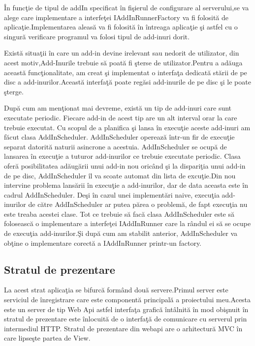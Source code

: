 \documentclass[a4paper,12pt]{report}
\begin{document}
\^In func\c tie de tipul de addIn specificat \^in fi\c sierul de configurare al serverului,se va alege care implementare a 
interfe\c tei IAddInRunnerFactory va fi folosit\u a de aplica\c tie.Implementarea aleas\u a va fi folosit\u a \^in \^intreaga
aplica\c tie  \c si astfel cu o singur\u a verificare programul va folosi tipul de add-inuri dorit.

Exist\u a situa\c tii \^in care un add-in devine irelevant sau nedorit de utilizator, din acest motiv,Add-Inurile trebuie 
s\u a poat\u a fi \c sterse de utilizator.Pentru a ad\u auga aceast\u a func\c tionalitate, am creat \c si implementat o
 interfa\c ta dedicat\u a st\u arii de pe disc a add-inurilor.Aceast\u a interfa\c t\u a poate reg\u asi add-inurile de pe disc
 \c si le poate \c sterge.

 Dup\u a cum am men\c tionat mai devreme, exist\u a un tip de add-inuri care sunt executate periodic. Fiecare add-in de acest tip 
 are un alt interval orar la care trebuie executat. Cu scopul de a planifica \c si lansa \^in execu\c tie aceste add-inuri am f\u acut
 clasa AddInScheduler. AddInScheduler opereaz\u a \^intr-un fir de execu\c tie separat datorit\u a naturii asincrone a acestuia.
  AddInScheduler se ocup\u a de lansarea \^in execu\c tie a tuturor add-inurilor ce trebuie executate periodic.
 Clasa ofer\u a posibilitatea ad\u aug\u arii unui add-in nou oric\^and \c si la dispari\c tia unui add-in de pe disc, AddInScheduler
 \^il va scoate automat din lista de excu\c tie.Din nou intervine problema lans\u arii \^in execu\c tie a add-inurilor,
 dar de data aceasta este \^in cadrul AddInScheduler. De\c si \^in cazul unei implement\u ari naive, execu\c tia add-inurilor
 de c\u atre AddInScheduler ar putea p\u area o problem\u a, de fapt execu\c tia nu este treaba acestei clase.
 Tot ce trebuie s\u a fac\u a clasa AddInScheduler este s\u a foloseasc\u a o implementare a interfe\c tei IAddInRunner 
 care la r\^andul ei s\u a se ocupe de execu\c tia add-inurilor.\c Si dup\u a cum am stabilit anterior, AddInScheduler
 va ob\c tine o implementare corect\u a a IAddInRunner printr-un factory. 

\subsection{Stratul de prezentare}

La acest strat aplica\c tia se bifurc\u a form\^and dou\u a servere.Primul server este serviciul de \^inregistrare
care este component\u a principal\u a a proiectului meu.Acesta este un server de tip Web Api astfel interfa\c ta grafic\u a
\^int\^alnit\u a \^in mod obi\c snuit \^in stratul de prezentare este \^inlocuit\u a de o interfa\c t\u a de comunicare
cu serverul prin intermediul HTTP. Stratul de prezentare din webapi are o arhitectur\u a MVC \^in care lipse\c ste partea
de View.
\end{document}

